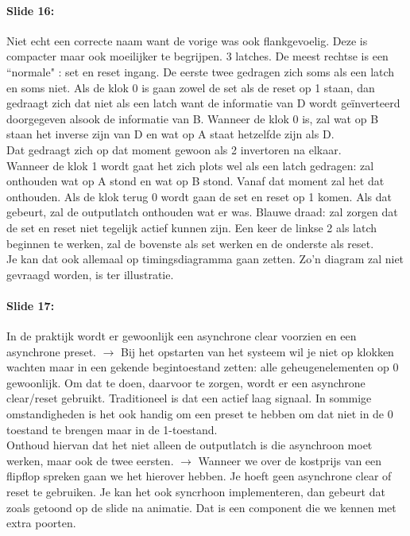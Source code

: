 \documentclass[10pt,a4paper]{book}
\begin{document}
\paragraph{Slide 16:} Niet echt een correcte naam want de vorige was ook flankgevoelig. Deze is compacter maar ook moeilijker te begrijpen. 3 latches. De meest rechtse is een ``normale" : set en reset ingang. De eerste twee gedragen zich soms als een latch en soms niet. Als de klok 0 is gaan zowel de set als de reset op 1 staan, dan gedraagt zich dat niet als een latch want de informatie van D wordt ge\"inverteerd doorgegeven alsook de informatie van B. Wanneer de klok 0 is, zal wat op B staan het inverse zijn van D en wat op A staat hetzelfde zijn als D.\\
Dat gedraagt zich op dat moment gewoon als 2 invertoren na elkaar.\\
Wanneer de klok 1 wordt gaat het zich plots wel als een latch gedragen: zal onthouden wat op A stond en wat op B stond. Vanaf dat moment zal het dat onthouden. Als de klok terug 0 wordt gaan de set en reset op 1 komen. Als dat gebeurt, zal de outputlatch onthouden wat er was. Blauwe draad: zal zorgen dat de set en reset niet tegelijk actief kunnen zijn. Een keer de linkse 2 als latch beginnen te werken, zal de bovenste als set werken en de onderste als reset.\\
Je kan dat ook allemaal op timingsdiagramma gaan zetten. Zo'n diagram zal niet gevraagd worden, is ter illustratie.

\paragraph{Slide 17:} In de praktijk wordt er gewoonlijk een asynchrone clear voorzien en een asynchrone preset. $\rightarrow$ Bij het opstarten van het systeem wil je niet op klokken wachten maar in een gekende begintoestand zetten: alle geheugenelementen op 0 gewoonlijk. Om dat te doen, daarvoor te zorgen, wordt er een asynchrone clear/reset gebruikt. Traditioneel is dat een actief laag signaal. In sommige omstandigheden is het ook handig om een preset te hebben om dat niet in de 0 toestand te brengen maar in de 1-toestand.\\
Onthoud hiervan dat het niet alleen de outputlatch is die asynchroon moet werken, maar ook de twee eersten. $\rightarrow$ Wanneer we over de kostprijs van een flipflop spreken gaan we het hierover hebben.
Je hoeft geen asynchrone clear of reset te gebruiken. Je kan het ook syncrhoon implementeren, dan gebeurt dat zoals getoond op de slide na animatie. Dat is een component die we kennen met extra poorten.
\end{document}
